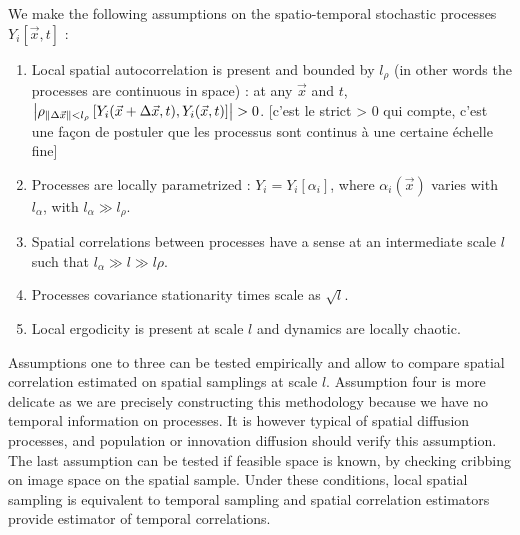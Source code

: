 We make the following assumptions on the spatio-temporal stochastic processes $Y_i\left[\vec{x},t\right]$ :
\begin{enumerate}
\item Local spatial autocorrelation is present and bounded by $l_{\rho}$ (in other words the processes are continuous in space) : at any $\vec{x}$ and $t$, $\left|\rho_{\| \Delta \vec{x} \| < l_{\rho}}\left[Y_i (\vec{x}+\Delta \vec{x},t), Y_i (\vec{x},t) \right]\right| > 0$. [c'est le strict > 0 qui compte, c'est une façon de postuler que les processus sont continus à une certaine échelle fine]
\item Processes are locally parametrized : $Y_i = Y_i\left[\alpha_i\right]$, where $\alpha_i (\vec{x})$ varies with $l_{\alpha}$, with $l_{\alpha} \gg l_{\rho}$.
\item Spatial correlations between processes have a sense at an intermediate scale $l$ such that $l_{\alpha}\gg l \gg l{\rho}$.
\item Processes covariance stationarity times scale as $\sqrt{l}$.
\item Local ergodicity is present at scale $l$ and dynamics are locally chaotic.
\end{enumerate}


Assumptions one to three can be tested empirically and allow to compare spatial correlation estimated on spatial samplings at scale $l$. Assumption four is more delicate as we are precisely constructing this methodology because we have no temporal information on processes. It is however typical of spatial diffusion processes, and population or innovation diffusion should verify this assumption. 
 The last assumption can be tested if feasible space is known, by checking cribbing on image space on the spatial sample. Under these conditions, local spatial sampling is equivalent to temporal sampling and spatial correlation estimators provide estimator of temporal correlations.










\newpage




